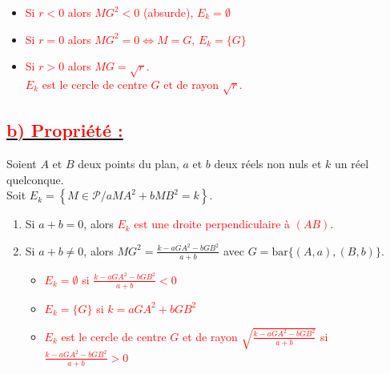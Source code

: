 \documentclass[12pt,a4paper]{article}
\begin{document}
\begin{enumerate}
\begin{enumerate}
\begin{itemize}
    \item \textcolor{red}{Si $r < 0$ alors $MG^2 < 0$ (absurde), $E_k = \emptyset$}
    \item \textcolor{red}{Si $r = 0$ alors $MG^2 = 0 \iff M = G$, $E_k = \{G\}$}
\end{itemize}

\vspace{0.3cm}

\begin{itemize}
    \item \textcolor{red}{Si $r > 0$ alors $MG = \sqrt{r}$.} \\
    \textcolor{red}{$E_k$ est le cercle de centre $G$ et de rayon $\sqrt{r}$.}
\end{itemize}
\end{enumerate}
\end{enumerate}

\subsection*{\underline{\textbf{\textcolor{red}{b) Propriété :}}}}

Soient $A$ et $B$ deux points du plan, $a$ et $b$ deux réels non nuls et $k$ un réel quelconque. \\
Soit $E_k = \left\{ M \in \mathcal{P} \big/ aMA^2 + bMB^2 = k \right\}$.

\begin{enumerate}
    \item Si $a + b = 0$, alors \textcolor{red}{$E_k$ est une droite perpendiculaire à $(AB)$}.
    \item Si $a + b \neq 0$, alors $MG^2 = \frac{k - a GA^2 - b GB^2}{a + b}$ avec $G = \text{bar}\{(A, a), (B, b)\}$.
    \begin{itemize}
        \item \textcolor{red}{$E_k = \emptyset$ si $\frac{k - a GA^2 - b GB^2}{a + b} < 0$}
        \item \textcolor{red}{$E_k = \{G\}$ si $k = a GA^2 + b GB^2$}
        \item \textcolor{red}{$E_k$ est le cercle de centre $G$ et de rayon $\sqrt{\frac{k - a GA^2 - b GB^2}{a + b}}$ si $\frac{k - a GA^2 - b GB^2}{a + b} > 0$}
    \end{itemize}
\end{enumerate}

\vspace{0.5cm}
\end{document}

